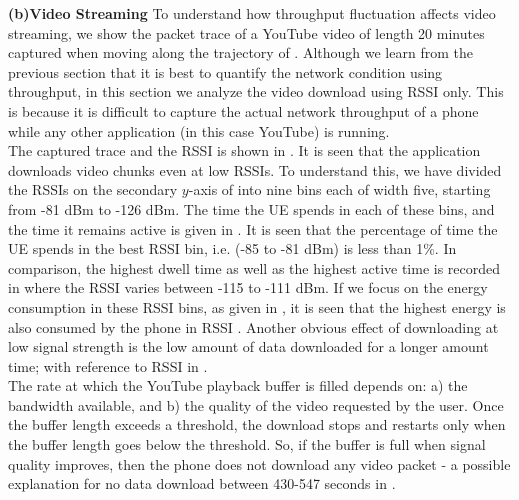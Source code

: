 {\textbf{(b)Video Streaming}}\label{section:vstreaming}
To understand how throughput fluctuation affects video streaming, 
we show the packet trace of a YouTube video of length 20 minutes captured when moving along the trajectory of \fig{\ref{fig:technology_with_traj}}.  Although we learn from the previous section that it is best to quantify the network condition using throughput, in this section we analyze the video download using \ac{RSSI} only. This is because it is difficult to capture the actual network throughput of a phone while any other application (in this case YouTube) is running.\\
\indent The  captured trace and the \ac{RSSI}  is shown in \fig{\ref{fig:pcap_RSSI}}. It is seen that the application downloads video chunks even at low \acp{RSSI}. To understand this, we have divided the \acp{RSSI} on the secondary $y$-axis of \fig{\ref{fig:pcap_RSSI}} into nine bins each of width five, starting from -81 dBm to -126 dBm. The time the \ac{UE} spends in each of these bins, and the time it remains active is given in \fig{\ref{fig:vid_time}}. It is seen that the percentage of time the \ac{UE} spends in the best \ac{RSSI} bin, i.e.  (-85 to -81 dBm) is less than 1\%. In comparison, the highest dwell time   as well as the highest active time is recorded in  where the \ac{RSSI} varies between -115 to -111 dBm. If we focus on the energy consumption in these \ac{RSSI} bins, as given in \fig{\ref{fig:vid_thpt}}, it is seen that the highest energy is also consumed by the phone in \ac{RSSI} . Another obvious effect of downloading at low signal strength is the low amount of data downloaded for a longer amount time; with reference to \ac{RSSI}  in \fig{\ref{fig:vid_thpt}}. \\
\indent The rate at which the YouTube playback buffer is filled depends on: a) the bandwidth available, and b) the quality of the video requested by the user. Once the buffer length exceeds a threshold, the download stops and restarts only when the buffer length goes below the threshold. So, if the buffer is full when signal quality improves, then the phone does not download any video packet - a possible explanation for no data download between  430-547 seconds in \fig{ \ref{fig:pcap_RSSI}}. \\
